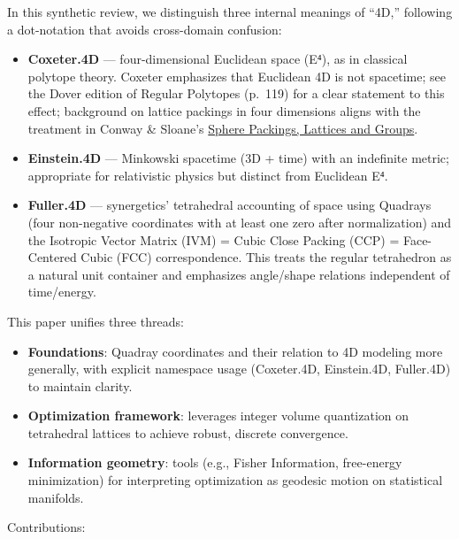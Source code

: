 \documentclass[
  10pt,
]{article}
\providecommand{\tightlist}{%
  \setlength{\itemsep}{0pt}\setlength{\parskip}{0pt}}
\begin{document}
In this synthetic review, we distinguish three internal meanings of
``4D,'' following a dot-notation that avoids cross-domain confusion:

\begin{itemize}
\tightlist
\item
  \textbf{Coxeter.4D} --- four-dimensional Euclidean space (E⁴), as in
  classical polytope theory. Coxeter emphasizes that Euclidean 4D is not
  spacetime; see the Dover edition of Regular Polytopes (p.~119) for a
  clear statement to this effect; background on lattice packings in four
  dimensions aligns with the treatment in Conway \& Sloane's
  \href{https://link.springer.com/book/10.1007/978-1-4757-6568-7}{Sphere
  Packings, Lattices and Groups}.
\item
  \textbf{Einstein.4D} --- Minkowski spacetime (3D + time) with an
  indefinite metric; appropriate for relativistic physics but distinct
  from Euclidean E⁴.
\item
  \textbf{Fuller.4D} --- synergetics' tetrahedral accounting of space
  using Quadrays (four non-negative coordinates with at least one zero
  after normalization) and the Isotropic Vector Matrix (IVM) = Cubic
  Close Packing (CCP) = Face-Centered Cubic (FCC) correspondence. This
  treats the regular tetrahedron as a natural unit container and
  emphasizes angle/shape relations independent of time/energy.
\end{itemize}

This paper unifies three threads:

\begin{itemize}
\tightlist
\item
  \textbf{Foundations}: Quadray coordinates and their relation to 4D
  modeling more generally, with explicit namespace usage (Coxeter.4D,
  Einstein.4D, Fuller.4D) to maintain clarity.
\item
  \textbf{Optimization framework}: leverages integer volume quantization
  on tetrahedral lattices to achieve robust, discrete convergence.
\item
  \textbf{Information geometry}: tools (e.g., Fisher Information,
  free-energy minimization) for interpreting optimization as geodesic
  motion on statistical manifolds.
\end{itemize}

Contributions:
\end{document}
